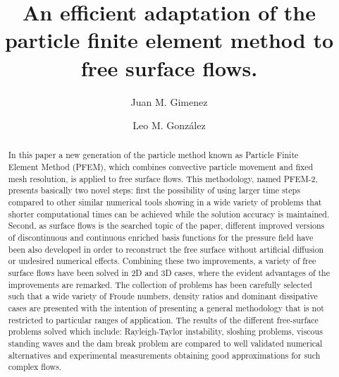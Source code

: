 \documentclass[review]{elsarticle}
\begin{document}
\begin{frontmatter}

\title{An efficient adaptation of the particle finite element method to free surface flows.}

\author{Juan M. Gimenez}
\address{CIMEC, Santa Fe, Argentina}
\author{Leo M. Gonz\'{a}lez}
\address{UPM, Madrid, Spain}

%
%
%

\begin{abstract}
In this paper a new generation of the particle method known as Particle Finite Element Method (PFEM), which combines convective particle movement and fixed mesh resolution, is applied to free surface flows. This methodology, named PFEM-2, presents basically two novel steps: first the possibility of using larger time steps compared to other similar numerical tools showing in a wide variety of problems that shorter computational times can be achieved while the solution accuracy is maintained. Second, as surface flows is the searched topic of the paper, different improved versions of discontinuous and continuous enriched basis functions for the pressure field have been also developed in order to reconstruct the free surface without artificial diffusion or undesired numerical effects. Combining these two improvements, a variety of free surface flows have been solved in 2D and 3D cases, where the evident advantages of the improvements are remarked. The collection of problems has been carefully selected such that a wide variety of Froude numbers, density ratios and dominant dissipative cases are presented with the intention of presenting a general methodology that is not restricted to particular ranges of application.
The results of the different free-surface problems solved which include: Rayleigh-Taylor instability, sloshing problems, viscous standing waves and the dam break problem are compared to well validated numerical alternatives and experimental measurements obtaining good approximations for such complex flows.
\end{abstract}


\end{frontmatter}
\end{document}
